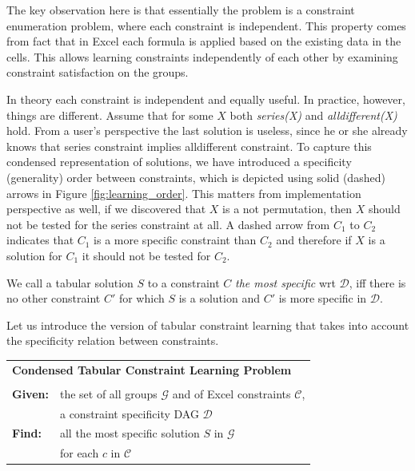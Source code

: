 \documentclass{ecai}
\newcommand{\constraints}{\ensuremath{\mathcal{C}}\xspace}
\newcommand{\dependencies}{\ensuremath{\mathcal{D}}\xspace}
\newcommand{\groups}{\ensuremath{\mathcal{G}}\xspace}
\begin{document}
  The key observation here is that essentially the problem is a constraint enumeration problem, where each constraint is independent. This property comes from fact that in Excel each formula is applied based on the existing data in the cells. This allows learning constraints independently of each other by examining constraint satisfaction on the groups.


In theory each constraint is independent and equally useful. In practice, however, things are different. Assume that for some $X$ both \textit{series(X)} and \textit{alldifferent(X)} hold. From a user's perspective the last solution is useless, since he or she already knows that series constraint implies alldifferent constraint. To capture this condensed representation \cite{condensed} of solutions, we have introduced a specificity (generality) order between constraints, which is depicted using solid (dashed) arrows in Figure \ref{fig:learning_order}. This matters from implementation perspective as well, if we discovered that $X$ is a not permutation, then $X$ should not be tested for the series constraint at all. A dashed arrow from $C_1$ to $C_2$ indicates that $C_1$ is a more specific constraint than $C_2$ and therefore if $X$ is a solution for $C_1$ it should not be tested for $C_2$.

We call a tabular solution $S$ to a constraint $C$ \textit{the most specific} wrt \dependencies, iff there is no other constraint $C'$ for which $S$ is a solution and $C'$ is more specific in \dependencies.


Let us introduce the version of tabular constraint learning that takes into account the specificity relation between constraints.

\begin{minipage}[c]{14em}
  \vspace{5pt}
  \begin{tabular}{ll}
    \multicolumn{2}{l}{{\textbf{Condensed Tabular Constraint Learning Problem}}}\\
    \vspace{-4pt}
    &\\
    \textbf{Given:}& the set of all groups $\groups$ and of Excel constraints $\constraints$,\\ 
    & a constraint specificity DAG \dependencies \\
    \textbf{Find:}& all the most specific solution $S$ in \groups\\
    & for each $c$ in \constraints \\
  \end{tabular}
  \vspace{6pt}
\end{minipage}
\end{document}
